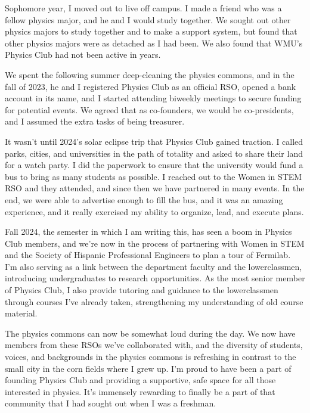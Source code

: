 \documentclass[11pt]{article}
\begin{document}
Sophomore year, I moved out to live off campus. I made a friend who was a fellow physics major, and he and I would study together. We sought out other physics majors to study together and to make a support system, but found that other physics majors were as detached as I had been. We also found that WMU's Physics Club had not been active in years.

We spent the following summer deep-cleaning the physics commons, and in the fall of 2023, he and I registered Physics Club as an official RSO, opened a bank account in its name, and I started attending biweekly meetings to secure funding for potential events. We agreed that as co-founders, we would be co-presidents, and I assumed the extra tasks of being treasurer.

It wasn't until 2024's solar eclipse trip that Physics Club gained traction. I called parks, cities, and universities in the path of totality and asked to share their land for a watch party. I did the paperwork to ensure that the university would fund a bus to bring as many students as possible. I reached out to the Women in STEM RSO and they attended, and since then we have partnered in many events. In the end, we were able to advertise enough to fill the bus, and it was an amazing experience, and it really exercised my ability to organize, lead, and execute plans.

Fall 2024, the semester in which I am writing this, has seen a boom in Physics Club members, and we're now in the process of partnering with Women in STEM and the Society of Hispanic Professional Engineers to plan a tour of Fermilab. I'm also serving as a link between the department faculty and the lowerclassmen, introducing undergraduates to research opportunities. As the most senior member of Physics Club, I also provide tutoring and guidance to the lowerclassmen through courses I've already taken, strengthening my understanding of old course material.

The physics commons can now be somewhat loud during the day. We now have members from these RSOs we've collaborated with, and the diversity of students, voices, and backgrounds in the physics commons is refreshing in contrast to the small city in the corn fields where I grew up. I'm proud to have been a part of founding Physics Club and providing a supportive, safe space for all those interested in physics. It's immensely rewarding to finally be a part of that community that I had sought out when I was a freshman.
\end{document}

